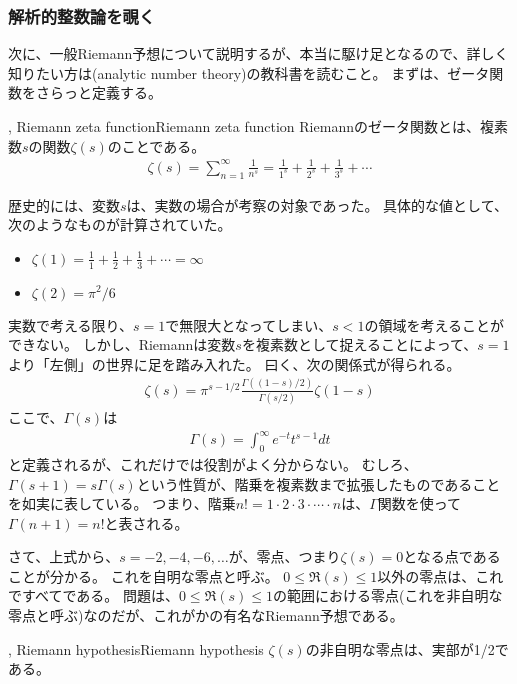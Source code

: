 \subsubsection{解析的整数論を覗く}
次に、一般Riemann予想について説明するが、本当に駆け足となるので、詳しく知りたい方は(analytic number theory)の教科書を読むこと。
まずは、ゼータ関数をさらっと定義する。

\begin{Defi}{, Riemann zeta function}{Riemann zeta function}
Riemannのゼータ関数とは、複素数$s$の関数$\zeta(s)$のことである。
\begin{align*}
\zeta(s) = \sum_{n=1}^{\infty} \frac{1}{n^s} = \frac{1}{1^s} + \frac{1}{2^s} + \frac{1}{3^s} + \cdots
\end{align*}
\end{Defi}

歴史的には、変数$s$は、実数の場合が考察の対象であった。
具体的な値として、次のようなものが計算されていた。
\begin{itemize}
\item $\zeta(1) = \frac{1}{1} + \frac{1}{2} + \frac{1}{3} + \cdots = \infty$
\item $\zeta(2) = \pi^2 / 6$
\end{itemize}

実数で考える限り、$s=1$で無限大となってしまい、$s<1$の領域を考えることができない。
しかし、Riemannは変数$s$を複素数として捉えることによって、$s=1$より「左側」の世界に足を踏み入れた。
曰く、次の関係式が得られる。
\begin{align*}
\zeta(s) = \pi^{s-1/2}\frac{\Gamma((1-s)/2)}{\Gamma(s/2)}\zeta(1-s)
\end{align*}
ここで、$\Gamma(s)$は
\begin{align*}
\Gamma(s) = \int_0^{\infty} e^{-t}t^{s-1}dt
\end{align*}
と定義されるが、これだけでは役割がよく分からない。
むしろ、$\Gamma(s+1) = s\Gamma(s)$という性質が、階乗を複素数まで拡張したものであることを如実に表している。
つまり、階乗$n! = 1\cdot2\cdot3\cdot\cdots\cdot{n}$は、$\Gamma$関数を使って$\Gamma(n+1)=n!$と表される。

さて、上式から、$s=-2,-4,-6,\ldots$が、零点、つまり$\zeta(s)=0$となる点であることが分かる。
これを自明な零点と呼ぶ。
$0\le\Re(s)\le1$以外の零点は、これですべてである。
問題は、$0\le\Re(s)\le1$の範囲における零点(これを非自明な零点と呼ぶ)なのだが、これがかの有名なRiemann予想である。

\begin{Conj}{, Riemann hypothesis}{Riemann hypothesis}
$\zeta(s)$の非自明な零点は、実部が1/2である。
\end{Conj}

